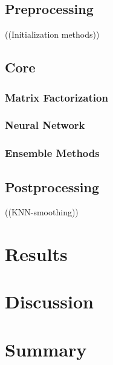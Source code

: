 \documentclass[10pt,conference,compsocconf]{IEEEtran}
\begin{document}
\subsection{Preprocessing}

((Initialization methods))

\subsection{Core}
\subsubsection{Matrix Factorization}
\subsubsection{Neural Network}
\subsubsection{Ensemble Methods}

\subsection{Postprocessing}
((KNN-smoothing))

\section{Results}
\label{sec:results}


\section{Discussion}
\label{sec:discussion}

\section{Summary}




\end{document}
